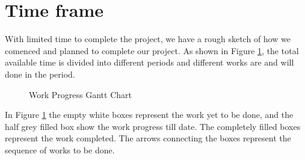 \section{Time frame}
	With limited time to complete the project, we have a rough sketch of how we comenced and planned to complete our project. As shown in Figure \ref{fig:GanttChart}, the total available time is divided into different periods and different works are and will done in the period. 


	\begin{figure}[htbp]
		\centering
		
		\caption{Work Progress Gantt Chart }
		\label{fig:GanttChart}	
	\end{figure}

	In Figure \ref{fig:GanttChart} the empty white boxes represent the work yet to be done, and the half grey filled box show the work progress till date. The completely filled boxes represent the work completed. The arrows connecting the boxes represent the sequence of works to be done.
\newpage

